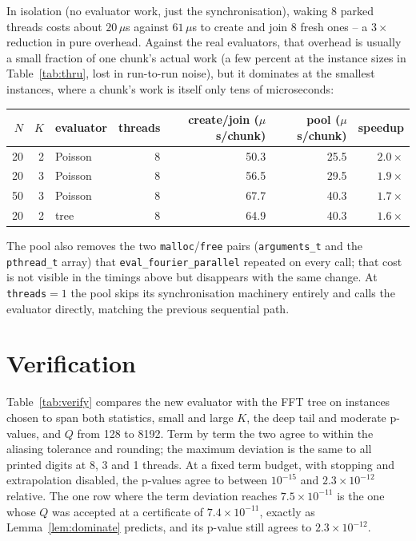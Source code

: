 \documentclass[11pt]{article}
\begin{document}
In isolation (no evaluator work, just the synchronisation), waking 8 parked threads costs about
$20\,\mu$s against $61\,\mu$s to create and join 8 fresh ones -- a $3\times$ reduction in pure
overhead. Against the real evaluators, that overhead is usually a small fraction of one chunk's
actual work (a few percent at the instance sizes in Table~\ref{tab:thru}, lost in run-to-run
noise), but it dominates at the smallest instances, where a chunk's work is itself only tens of
microseconds:
\begin{center}
\small
\begin{tabular}{rrlrrrr}
\toprule
$N$ & $K$ & evaluator & threads & create/join ($\mu$s/chunk) & pool ($\mu$s/chunk) & speedup \\
\midrule
20  & 2 & Poisson & 8 & 50.3 & 25.5 & $2.0\times$ \\
20  & 3 & Poisson & 8 & 56.5 & 29.5 & $1.9\times$ \\
50  & 3 & Poisson & 8 & 67.7 & 40.3 & $1.7\times$ \\
20  & 2 & tree     & 8 & 64.9 & 40.3 & $1.6\times$ \\
\bottomrule
\end{tabular}
\end{center}
The pool also removes the two \texttt{malloc}/\texttt{free} pairs (\texttt{arguments\_t} and the
\texttt{pthread\_t} array) that \texttt{eval\_fourier\_parallel} repeated on every call; that cost
is not visible in the timings above but disappears with the same change. At \texttt{threads}$=1$
the pool skips its synchronisation machinery entirely and calls the evaluator directly, matching
the previous sequential path.

\section{Verification}
\label{sec:verify}

Table~\ref{tab:verify} compares the new evaluator with the FFT tree on instances chosen to span both
statistics, small and large $K$, the deep tail and moderate p-values, and $Q$ from 128 to 8192. Term
by term the two agree to within the aliasing tolerance and rounding; the maximum deviation is the
same to all printed digits at 8, 3 and 1 threads. At a fixed term budget, with stopping and
extrapolation disabled, the p-values agree to between $10^{-15}$ and $2.3\times10^{-12}$ relative.
The one row where the term deviation reaches $7.5\times10^{-11}$ is the one whose
$Q$ was accepted at a certificate of $7.4\times10^{-11}$, exactly as Lemma~\ref{lem:dominate}
predicts, and its p-value still agrees to $2.3\times10^{-12}$.
\end{document}
